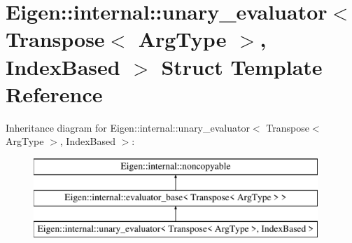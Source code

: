 \hypertarget{struct_eigen_1_1internal_1_1unary__evaluator_3_01_transpose_3_01_arg_type_01_4_00_01_index_based_01_4}{}\section{Eigen\+::internal\+::unary\+\_\+evaluator$<$ Transpose$<$ Arg\+Type $>$, Index\+Based $>$ Struct Template Reference}
\label{struct_eigen_1_1internal_1_1unary__evaluator_3_01_transpose_3_01_arg_type_01_4_00_01_index_based_01_4}
Inheritance diagram for Eigen\+::internal\+::unary\+\_\+evaluator$<$ Transpose$<$ Arg\+Type $>$, Index\+Based $>$\+:\begin{figure}[H]
\begin{center}
\leavevmode
\includegraphics[height=3.000000cm]{struct_eigen_1_1internal_1_1unary__evaluator_3_01_transpose_3_01_arg_type_01_4_00_01_index_based_01_4}
\end{center}
\end{figure}
